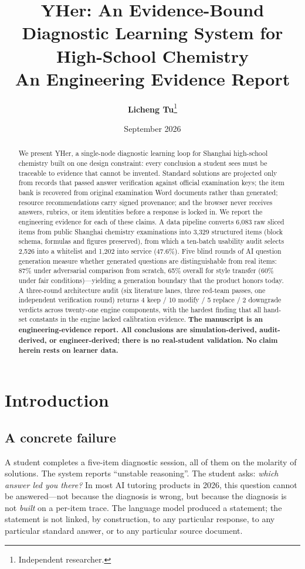 \documentclass[11pt]{article}
\title{\textbf{YHer: An Evidence-Bound Diagnostic Learning System for High-School Chemistry}\\
\large An Engineering Evidence Report}
\author{\textbf{Licheng Tu}\thanks{Independent researcher.}}
\date{September 2026}
\begin{document}
\makeatletter{}\makeatother
\maketitle

\begin{abstract}
\noindent
We present YHer, a single-node diagnostic learning loop for Shanghai high-school chemistry built on one design constraint: every conclusion a student sees must be traceable to evidence that cannot be invented. Standard solutions are projected only from records that passed answer verification against official examination keys; the item bank is recovered from original examination Word documents rather than generated; resource recommendations carry signed provenance; and the browser never receives answers, rubrics, or item identities before a response is locked in. We report the engineering evidence for each of these claims. A data pipeline converts 6,083 raw sliced items from public Shanghai chemistry examinations into 3,329 structured items (block schema, formulas and figures preserved), from which a ten-batch usability audit selects 2,526 into a whitelist and 1,202 into service (47.6\%). Five blind rounds of AI question generation measure whether generated questions are distinguishable from real items: 87\% under adversarial comparison from scratch, 65\% overall for style transfer (60\% under fair conditions)---yielding a generation boundary that the product honors today. A three-round architecture audit (six literature lanes, three red-team passes, one independent verification round) returns 4 keep / 10 modify / 5 replace / 2 downgrade verdicts across twenty-one engine components, with the hardest finding that all hand-set constants in the engine lacked calibration evidence. \textbf{The manuscript is an engineering-evidence report. All conclusions are simulation-derived, audit-derived, or engineer-derived; there is no real-student validation. No claim herein rests on learner data.}
\end{abstract}

\section{Introduction}
\label{sec:intro}

\subsection{A concrete failure}
A student completes a five-item diagnostic session, all of them on the molarity of solutions. The system reports ``unstable reasoning''. The student asks: \emph{which answer led you there?} In most AI tutoring products in 2026, this question cannot be answered---not because the diagnosis is wrong, but because the diagnosis is not \emph{built} on a per-item trace. The language model produced a statement; the statement is not linked, by construction, to any particular response, to any particular standard answer, or to any particular source document.
\end{document}
